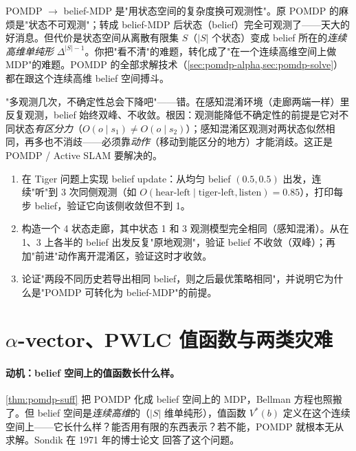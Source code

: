 \begin{insight}
POMDP $\to$ belief-MDP 是"用状态空间的复杂度换可观测性"。原 POMDP 的麻烦是"状态不可观测"；转成 belief-MDP 后状态（belief）完全可观测了——天大的好消息。但代价是状态空间从离散有限集 $S$（$|S|$ 个状态）变成 belief 所在的\emph{连续高维单纯形} $\Delta^{|S|-1}$。你把"看不清"的难题，转化成了"在一个连续高维空间上做 MDP"的难题。POMDP 的全部求解技术（\cref{sec:pomdp-alpha,sec:pomdp-solve}）都在跟这个连续高维 belief 空间搏斗。
\end{insight}

\begin{pitfall}
"多观测几次，不确定性总会下降吧"——错。在感知混淆环境（走廊两端一样）里反复观测，belief 始终双峰、不收敛。根因：观测能降低不确定性的前提是它对不同状态\emph{有区分力}（$O(o\mid s_1)\ne O(o\mid s_2)$）；感知混淆区观测对两状态似然相同，再多也不消歧——必须靠\emph{动作}（移动到能区分的地方）才能消歧。这正是 POMDP / Active SLAM 要解决的。
\end{pitfall}

\begin{practice}
\begin{enumerate}
  \item 在 Tiger 问题上实现 belief update：从均匀 belief $(0.5,0.5)$ 出发，连续"听"到 3 次同侧观测（如 $O(\text{hear-left}\mid\text{tiger-left},\text{listen})=0.85$），打印每步 belief，验证它向该侧收敛但不到 1。
  \item 构造一个 4 状态走廊，其中状态 1 和 3 观测模型完全相同（感知混淆）。从在 1、3 上各半的 belief 出发反复"原地观测"，验证 belief 不收敛（双峰）；再加"前进"动作离开混淆区，验证这时才收敛。
  \item 论证"两段不同历史若导出相同 belief，则之后最优策略相同"，并说明它为什么是"POMDP 可转化为 belief-MDP"的前提。
\end{enumerate}
\end{practice}

\section{\texorpdfstring{$\alpha$}{alpha}-vector、PWLC 值函数与两类灾难}
\label{sec:pomdp-alpha}

\paragraph{动机：belief 空间上的值函数长什么样。}
\cref{thm:pomdp-suff} 把 POMDP 化成 belief 空间上的 MDP，Bellman 方程也照搬了。但 belief 空间是\emph{连续高维}的（$|S|$ 维单纯形），值函数 $V^*(b)$ 定义在这个连续空间上——它长什么样？能否用有限的东西表示？若不能，POMDP 就根本无从求解。Sondik 在 1971 年的博士论文\cite{sondik1971optimal} 回答了这个问题。

